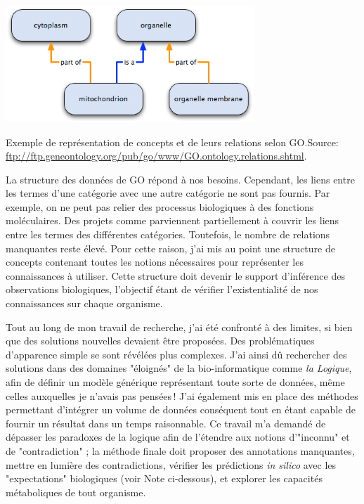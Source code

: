 \begin{refsegment}
\begin{shadedfigure}[H]
    \centering
    \includegraphics[width=0.7\textwidth]{img/dag_go_relation.png}
    \caption{Exemple de représentation de concepts et de leurs relations selon \acrfull{GO}.\hspace{\textwidth}\tiny{Source: \url{ftp://ftp.geneontology.org/pub/go/www/GO.ontology.relations.shtml}.}}
    \label{fig:go_relation}
\end{shadedfigure}


La structure des données de \gls{GO} répond à nos besoins. Cependant, les liens entre les termes d'une catégorie avec une autre catégorie ne sont pas fournis. Par exemple, on ne peut pas relier des processus biologiques à des fonctions moléculaires. Des projets comme \cite{AdditionalGO2006} parviennent partiellement à couvrir les liens  entre les termes des différentes catégories. Toutefois, le nombre de relations manquantes reste élevé. Pour cette raison, j'ai mis au point une structure de concepts contenant toutes les notions nécessaires pour représenter les connaissances à utiliser. Cette structure doit devenir le support d'inférence des observations biologiques, l'objectif étant de vérifier l'existentialité de nos connaissances sur chaque organisme.

Tout au long de mon travail de recherche, j'ai été confronté à des limites, si bien que des solutions nouvelles devaient être proposées. Des problématiques d'apparence simple se sont révélées plus complexes. J'ai ainsi dû rechercher des solutions dans des domaines "éloignés" de la bio-informatique comme \textit{la Logique}, afin de définir un modèle générique représentant toute sorte de données, même celles auxquelles je n'avais pas pensées ! J'ai également mis en place des méthodes permettant d'intégrer un volume de données conséquent tout en étant capable de fournir un résultat dans un temps raisonnable. Ce travail m'a demandé de dépasser les paradoxes de la logique afin de l'étendre aux notions d'"inconnu" et de "contradiction" ; la méthode finale doit proposer des annotations manquantes, mettre en lumière des contradictions, vérifier les prédictions \textit{in silico} avec les "expectations" biologiques (voir Note ci-dessous), et explorer les capacités métaboliques de tout organisme.


\end{refsegment}
